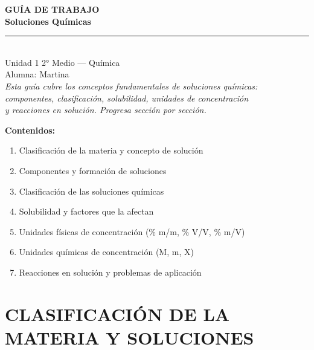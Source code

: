 \documentclass[11pt,a4paper]{article}
\begin{document}
\thispagestyle{empty}
\vspace*{3cm}
\begin{center}
  {\Huge\bfseries\color{azulprincipal} GUÍA DE TRABAJO}\\[8pt]
  {\LARGE\bfseries\color{azuloscuro} Soluciones Químicas}\\[15pt]
  {\color{azulprincipal}\rule{8cm}{2pt}}\\[15pt]
  {\Large Unidad 1 \textbar{} 2° Medio --- Química}\\[8pt]
  {\large Alumna: Martina}\\[25pt]
  {\itshape\color{gray}
  Esta guía cubre los conceptos fundamentales de soluciones químicas:\\
  componentes, clasificación, solubilidad, unidades de concentración\\
  y reacciones en solución. Progresa sección por sección.}
\end{center}

\vspace{2cm}
\noindent\textbf{Contenidos:}
\begin{enumerate}[leftmargin=2cm]
  \item Clasificación de la materia y concepto de solución
  \item Componentes y formación de soluciones
  \item Clasificación de las soluciones químicas
  \item Solubilidad y factores que la afectan
  \item Unidades físicas de concentración (\% m/m, \% V/V, \% m/V)
  \item Unidades químicas de concentración (M, m, X)
  \item Reacciones en solución y problemas de aplicación
\end{enumerate}
\newpage

\section{CLASIFICACIÓN DE LA MATERIA Y SOLUCIONES}
\end{document}
